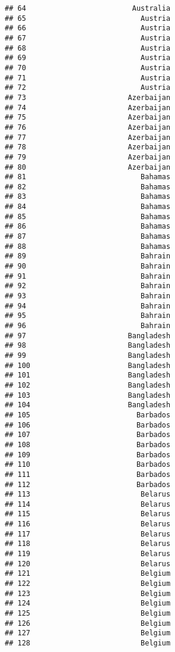 \documentclass[]{article}
\begin{document}
\begin{verbatim}
## 64                         Australia
## 65                           Austria
## 66                           Austria
## 67                           Austria
## 68                           Austria
## 69                           Austria
## 70                           Austria
## 71                           Austria
## 72                           Austria
## 73                        Azerbaijan
## 74                        Azerbaijan
## 75                        Azerbaijan
## 76                        Azerbaijan
## 77                        Azerbaijan
## 78                        Azerbaijan
## 79                        Azerbaijan
## 80                        Azerbaijan
## 81                           Bahamas
## 82                           Bahamas
## 83                           Bahamas
## 84                           Bahamas
## 85                           Bahamas
## 86                           Bahamas
## 87                           Bahamas
## 88                           Bahamas
## 89                           Bahrain
## 90                           Bahrain
## 91                           Bahrain
## 92                           Bahrain
## 93                           Bahrain
## 94                           Bahrain
## 95                           Bahrain
## 96                           Bahrain
## 97                        Bangladesh
## 98                        Bangladesh
## 99                        Bangladesh
## 100                       Bangladesh
## 101                       Bangladesh
## 102                       Bangladesh
## 103                       Bangladesh
## 104                       Bangladesh
## 105                         Barbados
## 106                         Barbados
## 107                         Barbados
## 108                         Barbados
## 109                         Barbados
## 110                         Barbados
## 111                         Barbados
## 112                         Barbados
## 113                          Belarus
## 114                          Belarus
## 115                          Belarus
## 116                          Belarus
## 117                          Belarus
## 118                          Belarus
## 119                          Belarus
## 120                          Belarus
## 121                          Belgium
## 122                          Belgium
## 123                          Belgium
## 124                          Belgium
## 125                          Belgium
## 126                          Belgium
## 127                          Belgium
## 128                          Belgium

\end{verbatim}
\end{document}
